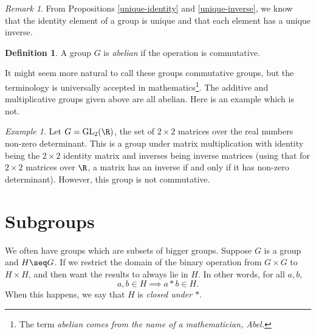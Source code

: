 \documentclass[12pt]{amsart}
\DeclareMathOperator{\GL}{GL}
\theoremstyle{plain}
\theoremstyle{definition}
\newtheorem{defn}[thm]{Definition}
\theoremstyle{remark}
\newtheorem*{remark}{Remark}
\newtheorem*{exam}{Example}
\begin{document}



\begin{remark}
From Propositions \ref{unique-identity} and \ref{unique-inverse}, we
know that the identity element of a group is unique and that each
element has a unique inverse.
\end{remark}

\begin{defn}
  A group $G$ is \emph{abelian} if the operation is commutative.
\end{defn}
It might seem more natural to call these groups commutative groups,
but the terminology is universally accepted in
mathematics\footnote{The term \em{abelian} comes from the name of a
  mathematician, Abel.}.  The additive and multiplicative groups given
above are all abelian.  Here is an example which is not.
\begin{exam}
  Let $G=\GL_2(\R)$, the set of $2\times 2$ matrices over the real
  numbers non-zero determinant.  This is a group under matrix
  multiplication with identity being the $2\times 2$ identity matrix
  and inverses being inverse matrices (using that for $2\times 2$
  matrices over $\R$, a matrix has an inverse if and only if it
  has non-zero determinant).  However, this group
  is not commutative.
\end{exam}

\section{Subgroups}

We often have groups which are subsets of bigger groups.  Suppose $G$
is a group and $H\seq G$.
If we restrict the domain of the binary operation from
$G\times G$ to $H\times H$, and then want the results to always lie in
$H$.  In other words, for all $a,b$,
\[ a,b\in H \implies a*b\in H.\]
When this happens, we say that $H$ is \emph{closed under $*$}.
\end{document}
